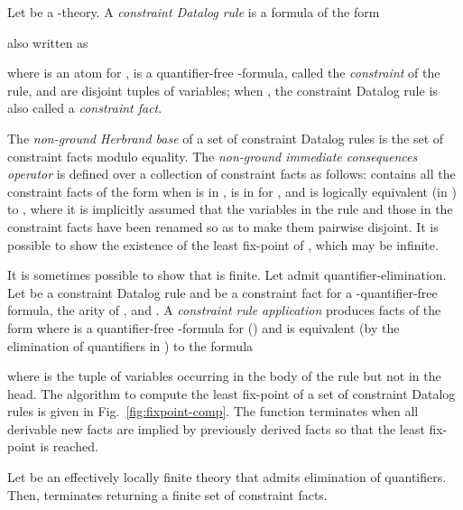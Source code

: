 \documentclass[conference]{llncs}
\begin{document}
{Let  be a -theory.  A \emph{constraint Datalog rule} is a
formula of the form

also written as

where  is an atom for ,
 is a quantifier-free
-formula, called the
\emph{constraint} of the rule, and  are
disjoint tuples of variables; when , the constraint Datalog rule is
also called a \emph{constraint fact}.

The \emph{non-ground Herbrand base} of a set  of constraint
Datalog rules is the set of constraint facts modulo equality. The
\emph{non-ground immediate consequences operator}
 is defined over a collection of constraint
facts  as follows:  contains all the
constraint facts of the form  when  is in ,  is in  for , and  is logically equivalent
(in ) to , where it is implicitly
assumed that the variables in the rule and those in the constraint facts
have been renamed so as to make them pairwise disjoint. It is possible
to show the existence of the least fix-point
 of , which may
be infinite.

It is sometimes possible to show that
 is finite. Let  admit
quantifier-elimination. Let  be a
constraint Datalog rule and  be a constraint fact for  a
-quantifier-free formula,  the arity
of , and . A \emph{constraint rule application}
produces  facts of the form  where  is a quantifier-free
-formula for  () and
 is equivalent (by the elimination of
quantifiers in ) to the formula

where  is the tuple of variables occurring in the body
of the rule but not in the head.  The algorithm to compute the least
fix-point of a set of constraint Datalog rules is given in
Fig.~\ref{fig:fixpoint-comp}. The function  terminates when all
derivable new facts are implied by previously derived facts so that
the least fix-point is reached.
\begin{theorem}
  \label{coro:fixpoint-termination}
  Let  be an effectively locally finite theory that admits
  elimination of quantifiers.  Then, 
  terminates returning a finite set of constraint facts.
\end{theorem}

}
\end{document}
